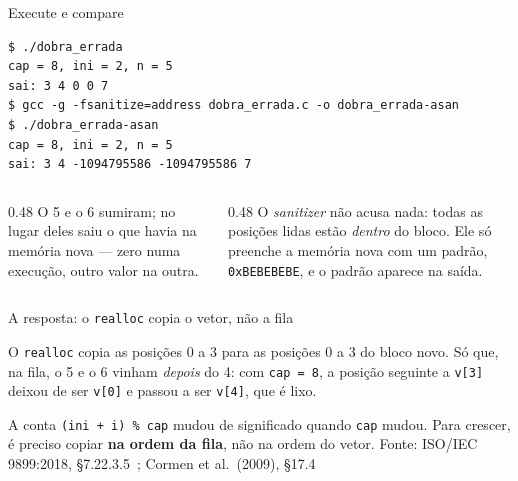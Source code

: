 \documentclass[aspectratio=169]{beamer}
\newcommand{\fonte}[1]{\vfill\hfill{\scriptsize\textcolor{UFSGray}{Fonte: #1}}}
\begin{document}
\begin{frame}[fragile]{Execute e compare}
\begin{lstlisting}[style=shellStyle]
$ ./dobra_errada
cap = 8, ini = 2, n = 5
sai: 3 4 0 0 7
$ gcc -g -fsanitize=address dobra_errada.c -o dobra_errada-asan
$ ./dobra_errada-asan
cap = 8, ini = 2, n = 5
sai: 3 4 -1094795586 -1094795586 7
\end{lstlisting}
  \begin{columns}[T]
    \begin{column}{0.48\textwidth}
      \small O 5 e o 6 sumiram; no lugar deles saiu o que havia na memória
      nova --- zero numa execução, outro valor na outra.
    \end{column}
    \begin{column}{0.48\textwidth}
      \small O \emph{sanitizer} não acusa nada: todas as posições lidas
      estão \emph{dentro} do bloco. Ele só preenche a memória nova com um
      padrão, \texttt{0xBEBEBEBE}, e o padrão aparece na saída.
    \end{column}
  \end{columns}
\end{frame}

\begin{frame}{A resposta: o \texttt{realloc} copia o vetor, não a fila}
  \begin{center}
  \end{center}
  \small
  O \texttt{realloc} copia as posições 0 a 3 para as posições 0 a 3 do bloco
  novo. Só que, na fila, o 5 e o 6 vinham \emph{depois} do 4: com
  \texttt{cap = 8}, a posição seguinte a \texttt{v[3]} deixou de ser
  \texttt{v[0]} e passou a ser \texttt{v[4]}, que é lixo.

  \medskip
  A conta \texttt{(ini + i) \% cap} mudou de significado quando \texttt{cap}
  mudou. Para crescer, é preciso copiar \textbf{na ordem da fila}, não na
  ordem do vetor.
  \fonte{ISO/IEC 9899:2018, §7.22.3.5~\cite{iso2018c17};
    Cormen et al.\ (2009), §17.4~\cite{cormen2009introduction}}
\end{frame}
\end{document}
